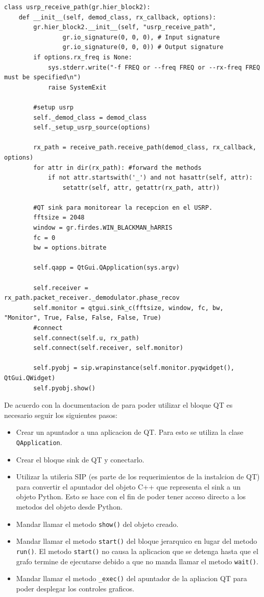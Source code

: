 \begin{lstlisting}[float, label=ex:qtsink, caption={Modificaci\'on del programa \emph{benchmark} para
desplegar el bloque grafico de QT.}, breaklines=true] 
class usrp_receive_path(gr.hier_block2):
    def __init__(self, demod_class, rx_callback, options):
        gr.hier_block2.__init__(self, "usrp_receive_path",
                gr.io_signature(0, 0, 0), # Input signature
                gr.io_signature(0, 0, 0)) # Output signature
        if options.rx_freq is None:
            sys.stderr.write("-f FREQ or --freq FREQ or --rx-freq FREQ must be specified\n")
            raise SystemExit

        #setup usrp
        self._demod_class = demod_class
        self._setup_usrp_source(options)

        rx_path = receive_path.receive_path(demod_class, rx_callback, options)
        for attr in dir(rx_path): #forward the methods
            if not attr.startswith('_') and not hasattr(self, attr):
                setattr(self, attr, getattr(rx_path, attr))

        #QT sink para monitorear la recepcion en el USRP.
        fftsize = 2048
        window = gr.firdes.WIN_BLACKMAN_hARRIS
        fc = 0
        bw = options.bitrate

        self.qapp = QtGui.QApplication(sys.argv)

        self.receiver = rx_path.packet_receiver._demodulator.phase_recov
        self.monitor = qtgui.sink_c(fftsize, window, fc, bw, "Monitor", True, False, False, False, True)
        #connect
        self.connect(self.u, rx_path)
        self.connect(self.receiver, self.monitor)

        self.pyobj = sip.wrapinstance(self.monitor.pyqwidget(), QtGui.QWidget)
        self.pyobj.show()
\end{lstlisting}

De acuerdo con la documentacion de \gnuradio para poder utilizar el bloque QT es necesario seguir
los siguientes pasos:
\begin{itemize}
  \item Crear un apuntador a una aplicacion de QT. Para esto se utiliza la clase
  \verb|QApplication|.
  \item Crear el bloque sink de QT y conectarlo.
  \item Utilizar la utileria SIP (es parte de los requerimientos de la instalcion de QT) para
  convertir el apuntador del objeto C++ que representa el sink a un objeto Python. Esto se hace con
  el fin de poder tener acceso directo a los metodos del objeto desde Python.
  \item Mandar llamar el metodo \verb|show()| del objeto creado.
  \item Mandar llamar el metodo \verb|start()| del bloque jerarquico en lugar del metodo
  \verb|run()|. El metodo \verb|start()| no causa la aplicacion que se detenga hasta que el grafo
  termine de ejecutarse debido a que no manda llamar el metodo \verb|wait()|.
  \item Mandar llamar el metodo \verb|_exec()| del apuntador de la apliacion QT para poder desplegar
  los controles graficos. 
\end{itemize}

